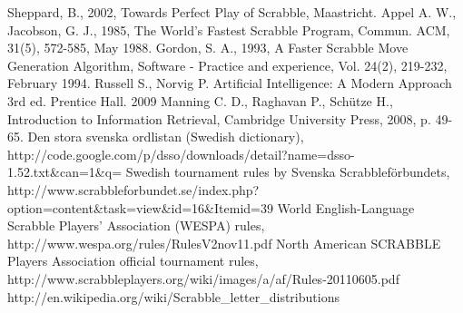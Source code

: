\documentclass[a4paper, 12pt]{report}
\begin{document}
\begin{thebibliography}{100}  
   Sheppard, B., 2002, Towards Perfect Play of Scrabble, Maastricht.
   Appel A. W., Jacobson, G. J., 1985, The World’s Fastest Scrabble Program, Commun. ACM, 31(5), 572-585, May 1988.
 Gordon, S. A., 1993, A Faster Scrabble Move Generation Algorithm, Software - Practice and experience, Vol. 24(2), 219-232, February 1994.
 Russell S., Norvig P. Artificial Intelligence: A Modern Approach 3rd ed. Prentice Hall. 2009
 Manning C. D., Raghavan P., Schütze H., Introduction to Information Retrieval, Cambridge University Press, 2008, p. 49-65.
 Den stora svenska ordlistan (Swedish dictionary), http://code.google.com/p/dsso/downloads/detail?name=dsso-1.52.txt\&can=1\&q=
 Swedish tournament rules by Svenska Scrabbleförbundets, http://www.scrabbleforbundet.se/index.php?option=content\&task=view\&id=16\&Itemid=39
 World English-Language Scrabble Players’ Association (WESPA) rules, http://www.wespa.org/rules/RulesV2nov11.pdf
 North American SCRABBLE Players Association official tournament rules, http://www.scrabbleplayers.org/wiki/images/a/af/Rules-20110605.pdf
 http://en.wikipedia.org/wiki/Scrabble\_letter\_distributions
\end{thebibliography}
\end{document}
